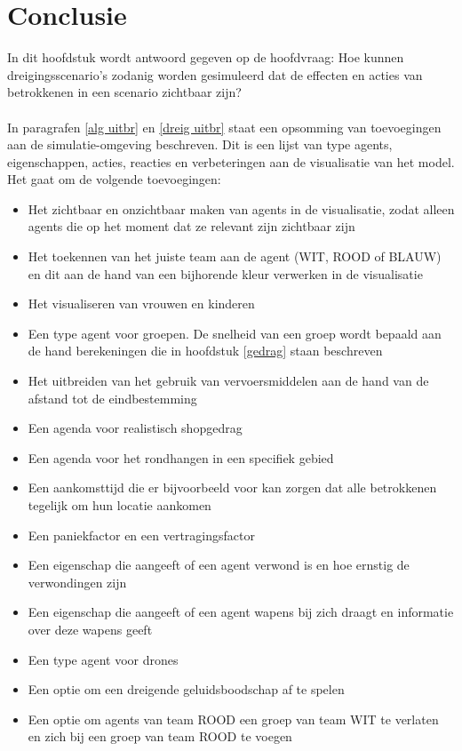 \documentclass[12pt, letterpaper]{article}
\begin{document}
\section{Conclusie} \label{conclusie}
In dit hoofdstuk wordt antwoord gegeven op de hoofdvraag: Hoe kunnen dreigingsscenario's zodanig worden gesimuleerd dat de effecten en acties van betrokkenen in een scenario zichtbaar zijn? \\ \\
In paragrafen \ref{alg uitbr} en \ref{dreig uitbr} staat een opsomming van toevoegingen aan de simulatie-omgeving beschreven. Dit is een lijst van type agents, eigenschappen, acties, reacties en verbeteringen aan de visualisatie van het model. Het gaat om de volgende toevoegingen:
\begin{itemize}
    \item Het zichtbaar en onzichtbaar maken van agents in de visualisatie, zodat alleen agents die op het moment dat ze relevant zijn zichtbaar zijn
    \item Het toekennen van het juiste team aan de agent (WIT, ROOD of BLAUW) en dit aan de hand van een bijhorende kleur verwerken in de visualisatie
    \item Het visualiseren van vrouwen en kinderen
    \item Een type agent voor groepen. De snelheid van een groep wordt bepaald aan de hand berekeningen die in hoofdstuk \ref{gedrag} staan beschreven
    \item Het uitbreiden van het gebruik van vervoersmiddelen aan de hand van de afstand tot de eindbestemming
    \item Een agenda voor realistisch shopgedrag
    \item Een agenda voor het rondhangen in een specifiek gebied
    \item Een aankomsttijd die er bijvoorbeeld voor kan zorgen dat alle betrokkenen tegelijk om hun locatie aankomen
    \item Een paniekfactor en een vertragingsfactor
    \item Een eigenschap die aangeeft of een agent verwond is en hoe ernstig de verwondingen zijn
    \item Een eigenschap die aangeeft of een agent wapens bij zich draagt en informatie over deze wapens geeft
    \item Een type agent voor drones
    \item Een optie om een dreigende geluidsboodschap af te spelen
    \item Een optie om agents van team ROOD een groep van team WIT te verlaten en zich bij een groep van team ROOD te voegen

\end{itemize}
\end{document}
